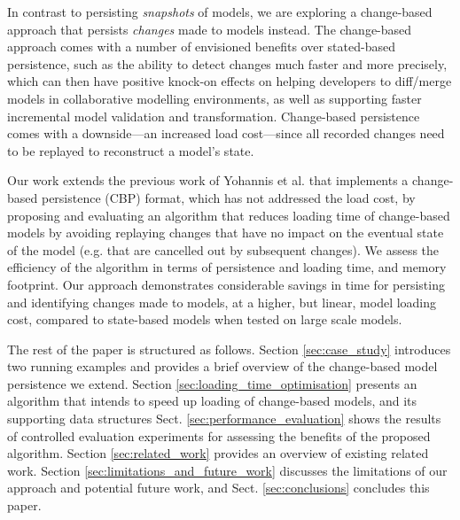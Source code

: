 \documentclass{llncs}
\begin{document}
In contrast to persisting \textit{snapshots} of models, we are exploring a change-based approach that persists \textit{changes} made to models instead. The change-based approach comes with a number of envisioned benefits over stated-based persistence, such as the ability to detect changes much faster and more precisely, which can then have positive knock-on effects on helping developers to diff/merge models in collaborative modelling environments, as well as supporting faster incremental model validation and transformation. Change-based persistence comes with a downside---an increased load cost---since all recorded changes need to be replayed to reconstruct a model's state.   

Our work extends the previous work of Yohannis et al. \cite{yohannis2017turning} that implements a change-based persistence (CBP) format, which has not addressed the load cost, by proposing and evaluating an algorithm that reduces loading time of change-based models by avoiding replaying changes that have no impact on the eventual state of the model (e.g. that are cancelled out by subsequent changes). We assess the efficiency of the algorithm in terms of persistence and loading time, and memory footprint. Our approach demonstrates considerable savings in time for persisting and identifying changes made to models, at a higher, but linear, model loading cost, compared to state-based models when tested on large scale models. %

The rest of the paper is structured as follows. Section \ref{sec:case_study} introduces two running examples and provides a brief overview of the change-based model persistence we extend. Section \ref{sec:loading_time_optimisation} presents an algorithm that intends to speed up loading of change-based models, and its supporting data structures %
Sect. \ref{sec:performance_evaluation} shows the results of controlled evaluation experiments for assessing the benefits of the proposed algorithm. Section \ref{sec:related_work} provides an overview of existing related work. Section \ref{sec:limitations_and_future_work} discusses the limitations of our approach and potential future work, and Sect. \ref{sec:conclusions} concludes this paper.
\end{document}
